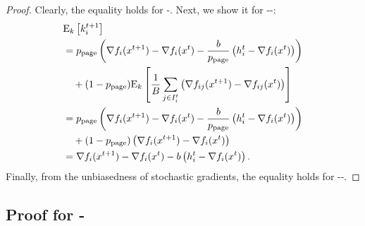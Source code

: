 \documentclass{article}
\newcommand*{\probpage}{\ensuremath{p_{\text{page}}}}
\begin{document}
\begin{proof}
  Clearly, the equality holds for -. Next, we show it for --:
  \begin{align*}
    &\ExpSub{k}{k^{t+1}_i} \\
    &= \probpage \left(\nabla f_i(x^{t+1}) - \nabla f_i(x^{t}) - \frac{b}{\probpage} \left(h^t_i - \nabla f_i(x^{t})\right)\right) \\
    &\quad + (1 - \probpage) \ExpSub{k}{\frac{1}{B}\sum_{j \in I^t_i}\left(\nabla f_{ij}(x^{t+1}) - \nabla f_{ij}(x^{t})\right)} \\
    &= \probpage \left(\nabla f_i(x^{t+1}) - \nabla f_i(x^{t}) - \frac{b}{\probpage} \left(h^t_i - \nabla f_i(x^{t})\right)\right) \\
    &\quad + (1 - \probpage) \left(\nabla f_i(x^{t+1}) - \nabla f_i(x^{t})\right) \\
    &= \nabla f_i(x^{t+1}) - \nabla f_i(x^{t}) - b \left(h^t_i - \nabla f_i(x^{t})\right).
\end{align*}
Finally, from the unbiasedness of stochastic gradients, the equality holds for --.
\end{proof}

\subsection{Proof for -}
\end{document}
